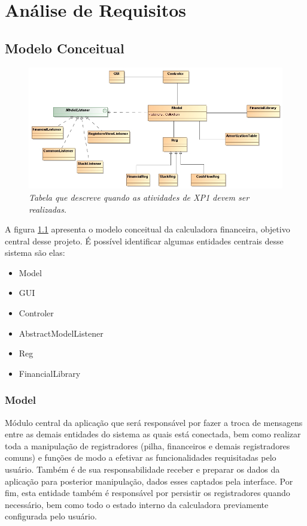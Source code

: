 \chapter{Análise de Requisitos}

\section{Modelo Conceitual}


\begin{figure}[!h]
 \includegraphics[scale=0.5]{CalcDC.jpg}
 \caption{\it Tabela que descreve quando as atividades de XP1 devem ser realizadas.} \label{tab:modeConc}
\end{figure}

A figura \ref{tab:modeConc} apresenta o modelo conceitual da calculadora financeira, objetivo central desse projeto. É possível identificar algumas entidades centrais desse sistema são elas:

\begin{itemize}
	\item Model
	\item GUI
	\item Controler
	\item AbstractModelListener
	\item Reg
	\item FinancialLibrary
\end{itemize}

\subsection{Model}
Módulo central da aplicação que será responsável por fazer a troca de mensagens entre as demais entidades do sistema as quais está conectada, bem como realizar toda a manipulação de registradores (pilha, financeiros e demais registradores comuns) e funções de modo a efetivar as funcionalidades requisitadas pelo usuário. Também é de sua responsabilidade receber e preparar os dados da aplicação para posterior manipulação, dados esses captados pela interface. Por fim, esta entidade também é responsável por persistir os registradores quando necessário, bem como todo o estado interno da calculadora previamente configurada pelo usuário.

